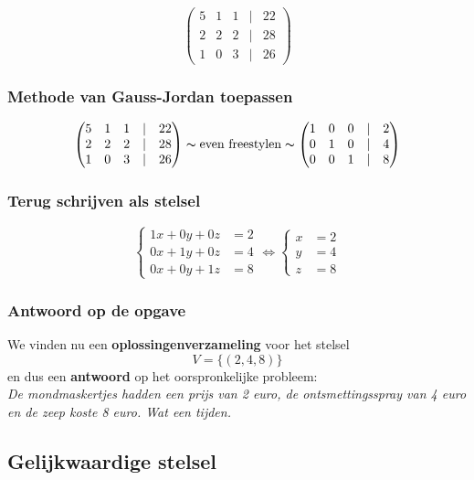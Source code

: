 \documentclass[12pt,twoside]{article}
\begin{document}
$$
\begin{pmatrix}
  5 & 1 & 1 & | & 22\\
  2 & 2 & 2 & | & 28\\
  1 & 0 & 3 & | & 26
\end{pmatrix}
$$

\subsubsection*{Methode van Gauss-Jordan toepassen}

$$
\begin{pmatrix}
  5 & 1 & 1 & | & 22\\
  2 & 2 & 2 & | & 28\\
  1 & 0 & 3 & | & 26
\end{pmatrix}
\thicksim\text{even freestylen}\thicksim
\begin{pmatrix}
  1 & 0 & 0 & | & 2\\
  0 & 1 & 0 & | & 4\\
  0 & 0 & 1 & | & 8
\end{pmatrix}
$$

\subsubsection*{Terug schrijven als stelsel}

$$\left\{
\begin{aligned}
  1x + 0y + 0z &= 2\\
  0x + 1y + 0z &= 4\\
  0x + 0y + 1z &= 8
\end{aligned}\right. \Leftrightarrow
\left\{
\begin{aligned}
  x &= 2\\
  y &= 4\\
  z &= 8
\end{aligned}\right.$$

\subsubsection*{Antwoord op de opgave}

We vinden nu een {\bf oplossingenverzameling} voor het stelsel
$$V = \{ (2,4,8) \}$$
en dus een {\bf antwoord} op het oorspronkelijke probleem:\\
{\it De mondmaskertjes hadden een prijs van 2 euro, de ontsmettingsspray van 4 euro en de zeep koste 8 euro. Wat een tijden.}

\subsection{Gelijkwaardige stelsel}
\end{document}
